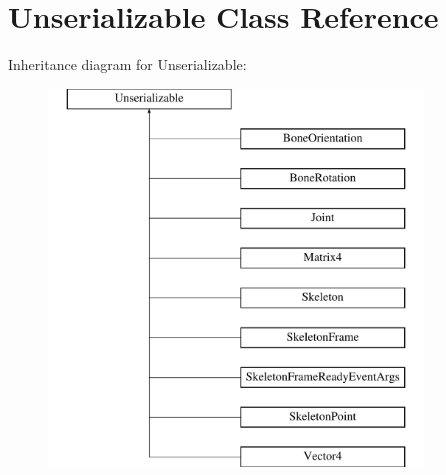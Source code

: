 \hypertarget{class_unserializable}{\section{\-Unserializable \-Class \-Reference}
\label{class_unserializable}
}
\-Inheritance diagram for \-Unserializable\-:\begin{figure}[H]
\begin{center}
\leavevmode
\includegraphics[height=10.000000cm]{class_unserializable}
\end{center}
\end{figure}
